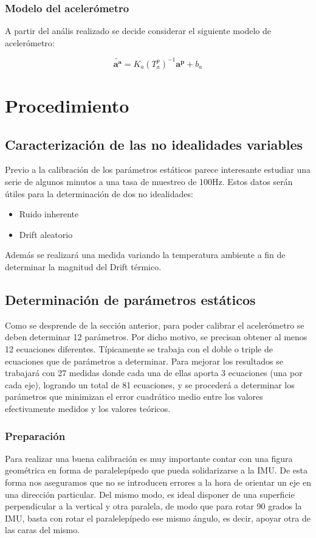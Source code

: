 \documentclass[main]{subfiles}
\begin{document}
\subsubsection{Modelo del acelerómetro}

A partir del anális realizado se decide considerar el siguiente modelo de acelerómetro:

\begin{equation}
\tilde{\mathbf{a^a}}=K_a(T_a^p)^{-1}\mathbf{a^p}+b_a
\label{ec:modelo_acc}
\end{equation}

\section{Procedimiento}
\subsection{Caracterización de las no idealidades variables}

Previo a la calibración de los parámetros estáticos parece interesante estudiar una serie de algunos minutos a una tasa de muestreo de 100Hz. Estos datos serán útiles para la determinación de dos no idealidades:  
\begin{itemize}
\item Ruido inherente
\item Drift aleatorio
\end{itemize}

Además se realizará una medida variando la temperatura ambiente a fin de determinar la magnitud del Drift térmico.

\subsection{Determinación de parámetros estáticos}

Como se desprende de la sección anterior, para poder calibrar el acelerómetro se deben determinar 12 parámetros. Por dicho motivo, se precisan obtener al menos 12 ecuaciones diferentes. Típicamente se trabaja con el doble o triple de ecuaciones que de parámetros a determinar. Para mejorar los resultados se trabajará con 27 medidas donde cada una de ellas aporta 3 ecuaciones (una por cada eje), logrando un total de 81 ecuaciones, y se procederá a determinar los parámetros que minimizan el error cuadrático medio entre los valores efectivamente medidos y los valores teóricos. 

\subsubsection*{Preparación}
Para realizar una buena calibración es muy importante contar con una figura geométrica en forma de paralelepípedo que pueda solidarizarse a la IMU. De esta forma nos aseguramos que no se introducen errores a la hora de orientar un eje en una dirección particular. Del mismo modo, es ideal disponer de una superficie perpendicular a la vertical y otra paralela, de modo que para rotar 90 grados la IMU, basta con rotar el paralelepípedo ese mismo ángulo, es decir, apoyar otra de las caras del mismo. \\
\end{document}
